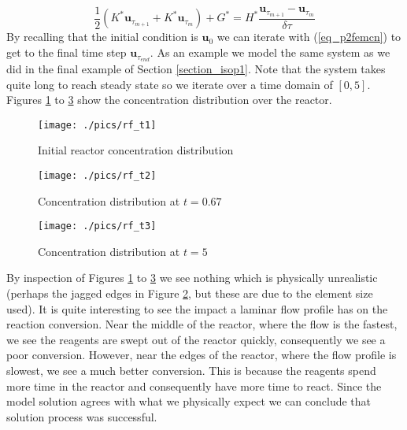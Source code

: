 \documentclass[11pt,fleqn]{article}
\theoremstyle{defstyle}
\begin{document}
\begin{equation}
\frac{1}{2}\left(K^*\mathbf{u}_{\tau_{m+1}} +K^*\mathbf{u}_{\tau_{m}}\right) + G^* = H^*\frac{\mathbf{u}_{\tau_{m+1}}-\mathbf{u}_{\tau_{m}}}{\delta \tau}
\label{eq_p2femcn}
\end{equation}
By recalling that the initial condition is $\mathbf{u}_0$ we can iterate with (\ref{eq_p2femcn}) to get to the final time step $\mathbf{u}_{\tau_{end}}$. As an example we model the same system as we did in the final example of Section \ref{section_isop1}. Note that the system takes quite long to reach steady state so we iterate over a time domain of $[0,5]$. Figures \ref{fig_rft1} to \ref{fig_rft3} show the concentration distribution over the reactor.
\begin{figure}[H] 
\centering
\texttt{[image: ./pics/rf\_t1]}
\caption{Initial reactor concentration distribution} 
\label{fig_rft1}
\end{figure}
\begin{figure}[H] 
\centering
\texttt{[image: ./pics/rf\_t2]}
\caption{Concentration distribution at $t=0.67$} 
\label{fig_rft2}
\end{figure}
\begin{figure}[H] 
\centering
\texttt{[image: ./pics/rf\_t3]}
\caption{Concentration distribution at $t=5$} 
\label{fig_rft3}
\end{figure}
By inspection of Figures \ref{fig_rft1} to \ref{fig_rft3} we see nothing which is physically unrealistic (perhaps the jagged edges in Figure \ref{fig_rft2}, but these are due to the element size used). It is quite interesting to see the impact a laminar flow profile has on the reaction conversion. Near the middle of the reactor, where the flow is the fastest, we see the reagents are swept out of the reactor quickly, consequently we see a poor conversion. However, near the edges of the reactor, where the flow profile is slowest, we see a much better conversion. This is because the reagents spend more time in the reactor and consequently have more time to react. Since the model solution agrees with what we physically expect we can conclude that solution process was successful.
\end{document}
